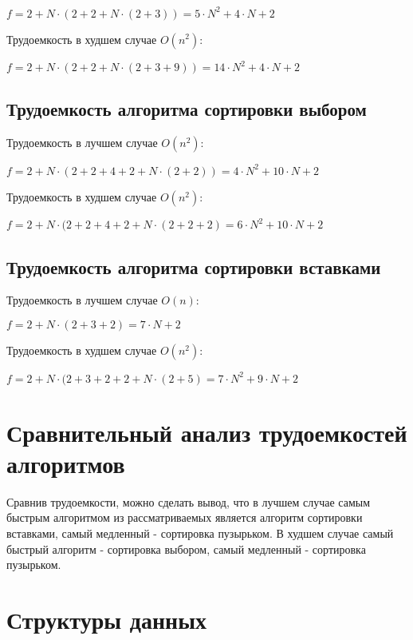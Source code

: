 $ f = 2 + N \cdot (2 + 2 + N \cdot (2 + 3)) = 5\cdot N^2 + 4 \cdot N + 2$\label{formula:complecitybubblegood}

Трудоемкость в худшем случае $ O(n^2) $:

$ f = 2 + N \cdot (2 + 2 + N \cdot (2 + 3 + 9)) = 14\cdot N^2 + 4\cdot N + 2$\label{formula:complecitybubblebad}
 

\subsection{Трудоемкость алгоритма сортировки выбором}\label{ComplecityChoise}

Трудоемкость в лучшем случае $ O(n^2) $:

$ f = 2 + N \cdot (2 + 2 + 4 + 2 + N \cdot (2 + 2)) = 4\cdot N^2 + 10 \cdot N + 2$\label{formula:complecitychoisegood}

Трудоемкость в худшем случае $ O(n^2) $:

$ f = 2 + N \cdot (2 + 2 + 4 + 2 + N \cdot (2 + 2 + 2) = 6\cdot N^2 + 10 \cdot N + 2$\label{formula:complecitychoisebad}

\subsection{Трудоемкость алгоритма сортировки вставками}\label{ComplecityInsert}

Трудоемкость в лучшем случае $ O(n) $:

$ f = 2 + N \cdot (2 + 3 + 2) = 7 \cdot N + 2$\label{formula:complecityinsertgood}

Трудоемкость в худшем случае $ O(n^2) $:

$ f = 2 + N \cdot (2 + 3 + 2 + 2 + N \cdot (2 + 5) = 7\cdot N^2 + 9 \cdot N + 2$\label{formula:complecityinsertbad}

\section{Сравнительный анализ трудоемкостей алгоритмов}\label{Konstructanalis}

Сравнив трудоемкости, можно сделать вывод, что в лучшем случае самым быстрым алгоритмом из рассматриваемых является алгоритм сортировки
вставками, самый медленный - сортировка пузырьком. В худшем случае самый быстрый алгоритм - сортировка выбором, самый медленный - 
сортировка пузырьком.

\section{Структуры данных}\label{Structs}

